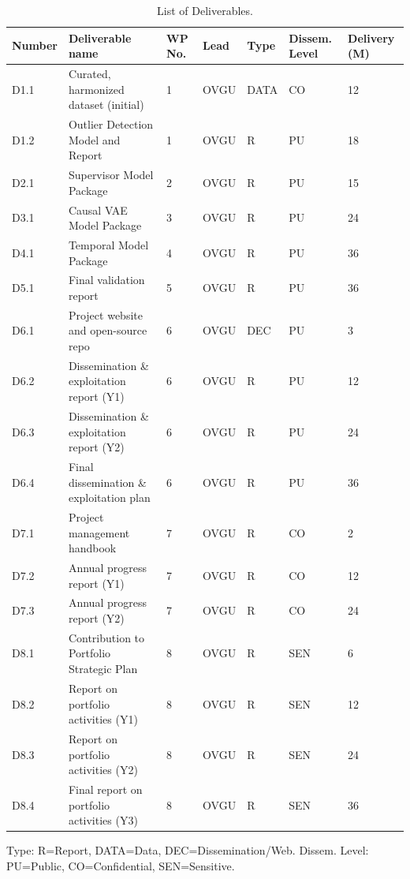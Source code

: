 \documentclass[11pt, a4paper]{article}
\begin{document}
\begin{table}[H]
    \centering
    \caption{ List of Deliverables.}
    \label{tab:deliverables}
    \small
    \begin{tabular}{l l l l l l l}
        \toprule
        \textbf{Number} & \textbf{Deliverable name} & \textbf{WP No.} & \textbf{Lead} & \textbf{Type} & \textbf{Dissem. Level} & \textbf{Delivery (M)} \\
        \midrule
        D1.1 & Curated, harmonized dataset (initial) & 1 & OVGU & DATA & CO & 12 \\
        D1.2 & Outlier Detection Model and Report & 1 & OVGU & R & PU & 18 \\
        D2.1 & Supervisor Model Package & 2 & OVGU & R & PU & 15 \\
        D3.1 & Causal VAE Model Package & 3 & OVGU & R & PU & 24 \\
        D4.1 & Temporal Model Package & 4 & OVGU & R & PU & 36 \\
        D5.1 & Final validation report & 5 & OVGU & R & PU & 36 \\
        D6.1 & Project website and open-source repo & 6 & OVGU & DEC & PU & 3 \\
        D6.2 & Dissemination \& exploitation report (Y1) & 6 & OVGU & R & PU & 12 \\
        D6.3 & Dissemination \& exploitation report (Y2) & 6 & OVGU & R & PU & 24 \\
        D6.4 & Final dissemination \& exploitation plan & 6 & OVGU & R & PU & 36 \\
        D7.1 & Project management handbook & 7 & OVGU & R & CO & 2 \\
        D7.2 & Annual progress report (Y1) & 7 & OVGU & R & CO & 12 \\
        D7.3 & Annual progress report (Y2) & 7 & OVGU & R & CO & 24 \\
        D8.1 & Contribution to Portfolio Strategic Plan & 8 & OVGU & R & SEN & 6 \\
        D8.2 & Report on portfolio activities (Y1) & 8 & OVGU & R & SEN & 12 \\
        D8.3 & Report on portfolio activities (Y2) & 8 & OVGU & R & SEN & 24 \\
        D8.4 & Final report on portfolio activities (Y3) & 8 & OVGU & R & SEN & 36 \\
        \bottomrule
    \end{tabular}

    \vspace{1ex} %
    Type: R=Report, DATA=Data, DEC=Dissemination/Web. Dissem. Level: PU=Public, CO=Confidential, SEN=Sensitive.
\end{table}
\end{document}
